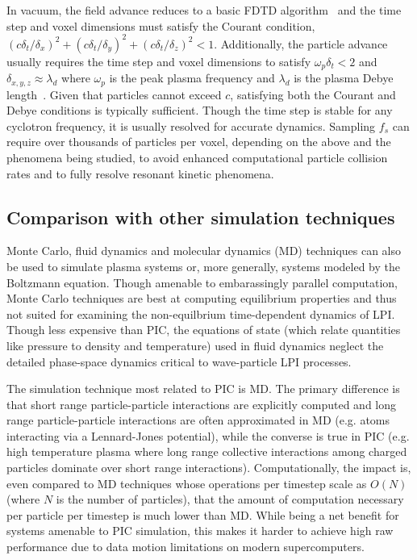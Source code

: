 \documentclass[journal,twoside]{IEEEtran}
\begin{document}
In vacuum, the field advance reduces to a basic FDTD
algorithm~\cite{Yee_1966} and the time step and voxel dimensions must
satisfy the Courant condition, $\left(c\delta_t/\delta_x\right)^2 +
\left(c\delta_t/\delta_y\right)^2 + \left(c\delta_t/\delta_z\right)^2
< 1$.  Additionally, the particle advance usually requires the time
step and voxel dimensions to satisfy $\omega_p \delta_t < 2$ and
$\delta_{x,y,z} \approx \lambda_d$ where $\omega_p$ is the peak plasma
frequency and $\lambda_d$ is the plasma Debye
length~\cite{Birdsall_Langdon_1985,Hockney_Eastwood_1988}.  Given that
particles cannot exceed $c$, satisfying both the Courant and Debye
conditions is typically sufficient.  Though the time step is stable
for any cyclotron frequency, it is usually resolved for accurate
dynamics.  Sampling $f_s$ can require over thousands of particles per
voxel, depending on the above and the phenomena being studied, to avoid
enhanced computational particle collision rates and to fully resolve
resonant kinetic phenomena.

\subsection{Comparison with other simulation techniques}

Monte Carlo, fluid dynamics and molecular dynamics (MD) techniques can
also be used to simulate plasma systems or, more generally, systems
modeled by the Boltzmann equation.  Though amenable to embarassingly
parallel computation, Monte Carlo techniques are best at computing
equilibrium properties and thus not suited for examining the
non-equilbrium time-dependent dynamics of LPI.  Though less expensive
than PIC, the equations of state (which relate quantities like
pressure to density and temperature) used in fluid dynamics neglect
the detailed phase-space dynamics critical to wave-particle LPI
processes.

The simulation technique most related to PIC is MD.  The primary
difference is that short range particle-particle interactions are
explicitly computed and long range particle-particle interactions are
often approximated in MD (e.g. atoms interacting via a Lennard-Jones
potential), while the converse is true in PIC (e.g. high temperature
plasma where long range collective interactions among charged
particles dominate over short range interactions).  Computationally,
the impact is, even compared to MD techniques whose operations per
timestep scale as $O(N)$ (where $N$ is the number of particles), that the
amount of computation necessary per particle per timestep is much
lower than MD.  While being a net benefit for systems amenable to PIC
simulation, this makes it harder to achieve high raw performance due
to data motion limitations on modern supercomputers.
\end{document}
